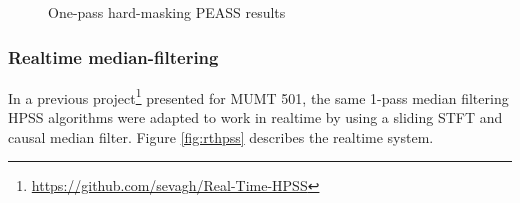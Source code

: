 \documentclass[letter,12pt]{article}
\begin{document}
\begin{figure}[ht]
	\centering
	\caption{One-pass hard-masking PEASS results}
	\label{fig:round1hard}
\end{figure}

\vfill
\clearpage

\subsubsection{Realtime median-filtering}

In a previous project\footnote{\url{https://github.com/sevagh/Real-Time-HPSS}} presented for MUMT 501, the same 1-pass median filtering HPSS algorithms were adapted to work in realtime by using a sliding STFT and causal median filter. Figure \ref{fig:rthpss} describes the realtime system.
\end{document}

